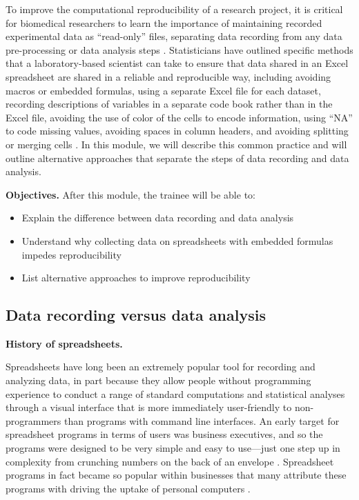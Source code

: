 \documentclass[]{tufte-book}
\providecommand{\tightlist}{%
  \setlength{\itemsep}{0pt}\setlength{\parskip}{0pt}}
\begin{document}
To improve the computational reproducibility of a research project, it is
critical for biomedical researchers to learn the importance of maintaining
recorded experimental data as ``read-only'' files, separating data recording from
any data pre-processing or data analysis steps \citep{broman2018data, marwick2018packaging}. Statisticians have outlined specific methods that a
laboratory-based scientist can take to ensure that data shared in an Excel
spreadsheet are shared in a reliable and reproducible way, including avoiding
macros or embedded formulas, using a separate Excel file for each dataset,
recording descriptions of variables in a separate code book rather than in the
Excel file, avoiding the use of color of the cells to encode information, using
``NA'' to code missing values, avoiding spaces in column headers, and avoiding
splitting or merging cells \citep{ellis2018share, broman2018data}. In this module,
we will describe this common practice and will outline alternative approaches
that separate the steps of data recording and data analysis.

\textbf{Objectives.} After this module, the trainee will be able to:

\begin{itemize}
\tightlist
\item
  Explain the difference between data recording and data analysis
\item
  Understand why collecting data on spreadsheets with embedded formulas impedes
  reproducibility
\item
  List alternative approaches to improve reproducibility
\end{itemize}

\hypertarget{data-recording-versus-data-analysis}{%
\subsection{Data recording versus data analysis}\label{data-recording-versus-data-analysis}}

\textbf{History of spreadsheets.}

Spreadsheets have long been an extremely popular tool for recording and
analyzing data, in part because they allow people without programming experience
to conduct a range of standard computations and statistical analyses through a
visual interface that is more immediately user-friendly to non-programmers than
programs with command line interfaces. An early target for spreadsheet programs
in terms of users was business executives, and so the programs were designed to
be very simple and easy to use---just one step up in complexity from crunching
numbers on the back of an envelope \citep{campbell2007number}. Spreadsheet programs
in fact became so popular within businesses that many attribute these programs
with driving the uptake of personal computers \citep{campbell2007number}.
\end{document}
